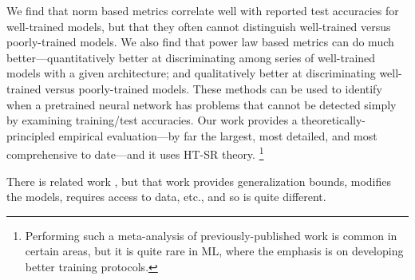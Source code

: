 \documentclass{article}
\begin{document}
We find that norm based metrics correlate well with reported test accuracies for well-trained models, but that they often cannot distinguish well-trained versus poorly-trained models.
We also find that power law based metrics can do much better---quantitatively better at discriminating among series of well-trained models with a given architecture; and qualitatively better at discriminating well-trained versus poorly-trained models.
These methods can be used to identify when a pretrained neural network has problems that cannot be detected simply by examining training/test accuracies.
%
%
Our work provides a theoretically-principled empirical evaluation---by far the largest, most detailed, and most comprehensive to date---and it uses HT-SR theory.%
\footnote{Performing such a meta-analysis of previously-published work is common in certain areas, but it is quite rare in ML, where the emphasis is on developing better training protocols.}

There is related work \citep{BFT17_TR,LMBx18_TR}, but that work provides generalization bounds, modifies the models, requires access to data, etc., and so is quite different.
\end{document}
